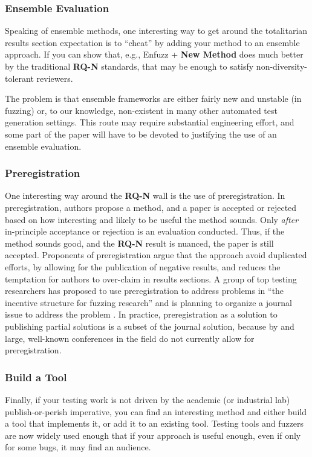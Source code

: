 \documentclass[sigplan,review]{acmart}
\begin{document}
\subsubsection{Ensemble Evaluation}

Speaking of ensemble methods, one interesting way to get around the totalitarian results section
expectation is to ``cheat'' by adding your method to an ensemble
approach.  If you can show that, e.g., Enfuzz + {\bf New Method} does much
better by the traditional {\bf RQ-N} standards, that may be enough to
satisfy non-diversity-tolerant reviewers.

The problem is that ensemble frameworks are either fairly new and
unstable (in fuzzing) or, to our knowledge, non-existent in many other
automated test generation settings.  This route may require
substantial engineering effort, and some part of the paper will have
to be devoted to justifying the use of an ensemble evaluation.

\subsubsection{Preregistration}

One interesting way around the {\bf RQ-N} wall is the use of
preregistration.  In preregistration, authors propose a method, and
a paper is accepted or rejected based on how interesting and likely to
be useful the method sounds.  Only \emph{after} in-principle
acceptance or rejection is an evaluation conducted.  Thus, if the
method sounds good, and the {\bf RQ-N} result is nuanced, the paper is
still accepted.  Proponents of preregistration argue that the approach
avoid duplicated efforts, by allowing for the publication of negative
results, and reduces the temptation for authors to over-claim in
results sections.  A group of top testing researchers has proposed to
use preregistration to address problems in ``the incentive structure
for fuzzing research'' and is planning to organize a journal issue to
address the problem \cite{special}.  In practice, preregistration as a solution to
publishing partial solutions is a subset of the journal solution,
because by and large, well-known conferences in the field do not currently allow
for preregistration.


\subsubsection{Build a Tool}

Finally, if your testing work is not driven by the academic (or
industrial lab) publish-or-perish imperative, you can find an
interesting method and either build a tool that implements it, or add
it to an existing tool.  Testing tools and fuzzers are now widely used
enough that if your approach is useful enough, even if only for some
bugs, it may find an audience.
\end{document}
